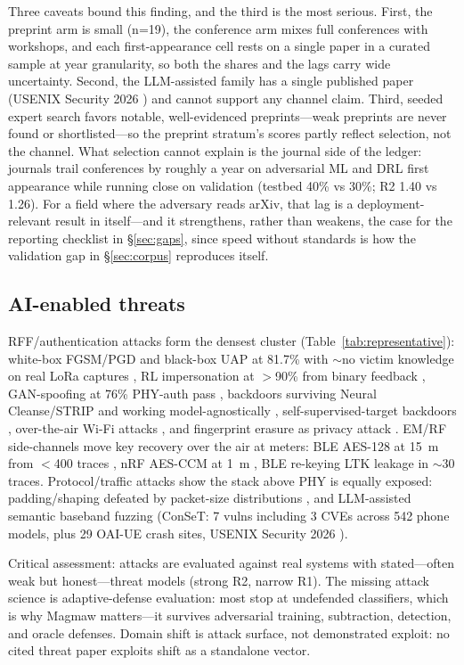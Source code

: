 Three caveats bound this finding, and the third is the most serious. First, the preprint arm is small (n=19), the conference arm mixes full conferences with workshops, and each first-appearance cell rests on a single paper in a curated sample at year granularity, so both the shares and the lags carry wide uncertainty. Second, the LLM-assisted family has a single published paper (USENIX Security 2026 ) and cannot support any channel claim. Third, seeded expert search favors notable, well-evidenced preprints---weak preprints are never found or shortlisted---so the preprint stratum's scores partly reflect selection, not the channel. What selection cannot explain is the journal side of the ledger: journals trail conferences by roughly a year on adversarial ML and DRL first appearance while running close on validation (testbed 40\% vs 30\%; R2 1.40 vs 1.26). For a field where the adversary reads arXiv, that lag is a deployment-relevant result in itself---and it strengthens, rather than weakens, the case for the reporting checklist in \S\ref{sec:gaps}, since speed without standards is how the validation gap in \S\ref{sec:corpus} reproduces itself.

\subsection{AI-enabled threats}
\label{sec:threat}
RFF/authentication attacks form the densest cluster (Table~\ref{tab:representative}): white-box FGSM/PGD and black-box UAP at 81.7\% with $\sim$no victim knowledge on real LoRa captures , RL impersonation at $>$90\% from binary feedback , GAN-spoofing at 76\% PHY-auth pass , backdoors surviving Neural Cleanse/STRIP  and working model-agnostically , self-supervised-target backdoors , over-the-air Wi-Fi attacks , and fingerprint erasure as privacy attack . EM/RF side-channels move key recovery over the air at meters: BLE AES-128 at 15~m from $<$400 traces , nRF AES-CCM at 1~m , BLE re-keying LTK leakage in $\sim$30 traces. Protocol/traffic attacks show the stack above PHY is equally exposed: padding/shaping defeated by packet-size distributions , and LLM-assisted semantic baseband fuzzing (ConSeT: 7 vulns including 3 CVEs across 542 phone models, plus 29 OAI-UE crash sites, USENIX Security 2026 ).

Critical assessment: attacks are evaluated against real systems with stated---often weak but honest---threat models (strong R2, narrow R1). The missing attack science is adaptive-defense evaluation: most stop at undefended classifiers, which is why Magmaw  matters---it survives adversarial training, subtraction, detection, and oracle defenses. Domain shift is attack surface, not demonstrated exploit: no cited threat paper exploits shift as a standalone vector.

